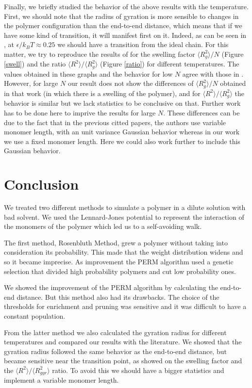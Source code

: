 \documentclass[aps,prl,reprint,groupedaddress]{revtex4-1}
\begin{document}
Finally, we briefly studied the behavior of the above results with the temperature. First, we should note that the radius of gyration is more sensible to changes in the polymer configuration than the end-to-end distance, which means that if we have some kind of transition, it will manifest first on it. Indeed, as can be seen in \cite{Witt1996}, at $\epsilon/k_B T \approx 0.25$ we should have a transition from the ideal chain. For this matter, we try to reproduce the results of \cite{Grassberger1997} for the swelling factor $\langle R_g^2\rangle/N$ (Figure \ref{swell}) and the ratio $\langle R^2\rangle/\langle R_g^2\rangle$ (Figure \ref{ratio}) for different temperatures. The values obtained in these graphs and the behavior for low $N$ agree with those in \cite{Grassberger1997}. However, for large $N$ our result does not show the differences of $\langle R_g^2\rangle/N$ obtained in that work (in which there is a swelling of the polymer), and for $\langle R^2\rangle/\langle R_g^2\rangle$ the behavior is similar but we lack statistics to be conclusive on that. Further work has to be done here to imprive the results for large $N$. These differences can be due to the fact that in the previous citted papers, the authors use variable monomer length, with an unit variance Gaussian behavior whereas in our work we use a fixed monomer length. Here we could also work further to include this Gaussian behavior. 

\section{Conclusion \label{conclusion}}
We treated two different methods to simulate a polymer in a dilute solution with bad solvent. We used the Lennard-Jones potential to represent the interaction of the monomers of the polymer which led us to a self-avoiding walk. 

The first method, Rosenbluth Method, grew a polymer without taking into consideration its probability. This made that the weight distribution widens and so it became imprecise. As improvement the PERM algorithm used a genetic selection that divided high probability polymers and cut low probability ones.

We showed the improvement of the PERM algorithm by calculating the end-to-end distance. But this method also had its drawbacks. The choice of the thresholds for enrichment and pruning was sensitive and it was difficult to have a constant population.

From the latter method we also calculated the gyration radius for different temperatures and compared our results with the literature. We showed that the gyration radius followed the same behavior as the end-to-end distance, but became sensitive near the transition point, as showed on the swelling factor and the $\langle R^2\rangle /\langle R_{gyr}^2\rangle$ ratio. To avoid this we should have a bigger statistics and implement a variable monomer length.


\end{document}
